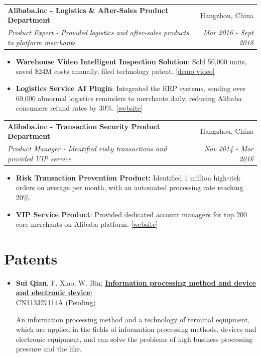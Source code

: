 \documentclass[letterpaper,11pt]{article}
\makeatletter
\newcommand{\resumeSubheading}[4]{
  \vspace{-3pt}\item
    \begin{tabular*}{0.97\textwidth}{l@{\extracolsep{\fill}}r}
      \textbf{#1} & #2 \\
      \textit{\small#3} & \textit{\small #4} \\
    \end{tabular*}\vspace{-8pt}
}
\newcommand{\resumeSubHeadingListEnd}{}
\newcommand{\resumeItemListStart}{\begin{itemize}}
\newcommand{\resumeItemListEnd}{\end{itemize}\vspace{-8pt}}
\makeatother
\begin{document}
\resumeSubheading {Alibaba.inc - Logistics \& After-Sales Product Department
}{Hangzhou, China} {Product Expert - Provided logistics and after-sales products to platform merchants}{Mar 2016 - Sept 2018}
      \resumeItemListStart
      \item {{\textbf{Warehouse Video Intelligent Inspection Solution}:}}
      {Sold 50,000 units, saved \$24M costs annually, filed technology patent. \href{https://gtxwsy.yuque.com/gtxwsy/miv5ag/ih3dqq?}{[demo video]}}
          \vspace{-5pt}
       \item {\textbf{Logistics Service AI Plugin}:}
      {Integrated the ERP systems, sending over 60,000 abnormal logistics reminders to merchants daily, reducing Alibaba consumers refund rates by 30\%. \href{https://aligenius.taobao.com/}{[website]}}
      \resumeItemListEnd      
\vspace{5pt}

\resumeSubheading
      {Alibaba.inc - Transaction Security Product Department}{Hangzhou, China} {Product Manager - Identified risky transactions and provided VIP  service}{Nov 2014 - Mar 2016}
      \resumeItemListStart
      \item {\textbf{Risk Transaction Prevention Product:}}
      {Identified 1 million high-risk orders on average per month, with an automated processing rate reaching 20\%. }
        \vspace{-5pt}
       \item {\textbf{VIP Service Product}:}
      {Provided dedicated account managers for top 200 core merchants on Alibaba platform. \href{http://alikey.tmall.com/}{[website]}}
      \resumeItemListEnd

\resumeSubHeadingListEnd
\vspace{5pt}

\section{Patents}
\begin{itemize}[leftmargin=*]
  \item {\textbf{Sui Qian}, F. Xiao, W. Bin; \textbf{\href{https://patents.google.com/patent/CN113327114A/en?oq=CN113327114A}{Information processing method and device and electronic device}}; {\\CN113327114A} (Pending)}
  
  {An information processing method and a technology of terminal equipment, which are applied in the fields of information processing methods, devices and electronic equipment, and can solve the problems of high business processing pressure and the like.}
\end{itemize}
\end{document}
